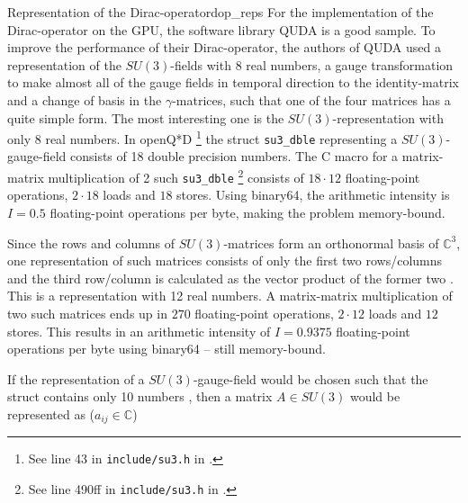 \documentclass{article}
\theoremstyle{plain} %
\theoremstyle{convention} %
\theoremstyle{remark} %
\def\code#1{\texttt{#1}}
\numberwithin{equation}{section}
\begin{document}
\begin{proposal}{Representation of the Dirac-operator}{dop_reps}
For the implementation of the Dirac-operator on the GPU, the software library QUDA \cite{clark2010} is a good sample. To improve the performance of their Dirac-operator, the authors of QUDA used a representation of the $SU(3)$-fields with \num{8} real numbers, a gauge transformation to make almost all of the gauge fields in temporal direction to the identity-matrix and a change of basis in the $\gamma$-matrices, such that one of the four matrices has a quite simple form. The most interesting one is the $SU(3)$-representation with only \num{8} real numbers. In openQ*D \footnote{See line 43 in \code{include/su3.h} in \cite{openqxd}.} the struct \code{su3\_dble} representing a $SU(3)$-gauge-field consists of \num{18} double precision numbers. The C macro for a matrix-matrix multiplication of 2 such \code{su3\_dble} \footnote{See line 490ff in \code{include/su3.h} in \cite{openqxd}.} consists of $18 \cdot 12$ floating-point operations, $2 \cdot 18$ loads and $18$ stores. Using \gls{binary64}, the arithmetic intensity is $I = 0.5$ floating-point operations per byte, making the problem memory-bound.

Since the rows and columns of $SU(3)$-matrices form an orthonormal basis of $\mathbb{C}^3$, one representation of such matrices consists of only the first two rows/columns and the third row/column is calculated as the vector product of the former two \cite{deforcrand1985}. This is a representation with \num{12} real numbers. A matrix-matrix multiplication of two such matrices ends up in $270$ floating-point operations, $2 \cdot 12$ loads and $12$ stores. This results in an arithmetic intensity of $I = 0.9375$ floating-point operations per byte using \gls{binary64} -- still memory-bound.

If the representation of a $SU(3)$-gauge-field would be chosen such that the struct contains only \num{10} numbers \cite{bunk1986}, then a matrix $A \in SU(3)$ would be represented as ($a_{ij} \in \mathbb{C}$)


\end{proposal}
\end{document}
